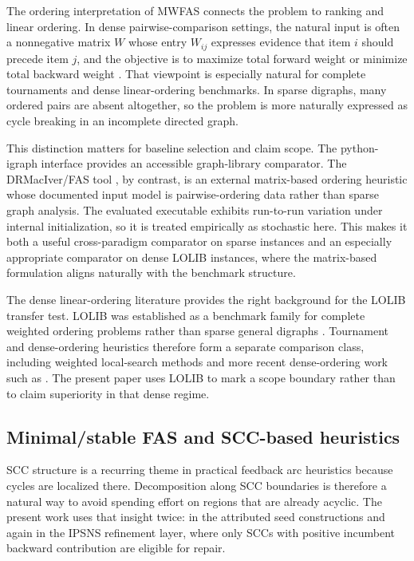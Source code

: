 The ordering interpretation of MWFAS connects the problem to ranking and linear ordering. In dense pairwise-comparison settings, the natural input is often a nonnegative matrix \(W\) whose entry \(W_{ij}\) expresses evidence that item \(i\) should precede item \(j\), and the objective is to maximize total forward weight or minimize total backward weight \cite{ACN08,CFR10}. That viewpoint is especially natural for complete tournaments and dense linear-ordering benchmarks. In sparse digraphs, many ordered pairs are absent altogether, so the problem is more naturally expressed as cycle breaking in an incomplete directed graph.

This distinction matters for baseline selection and claim scope. The python-igraph interface \cite{python_igraph_feedback_arc_set} provides an accessible graph-library comparator. The DRMacIver/FAS tool \cite{drmaciver_feedback_arc_set}, by contrast, is an external matrix-based ordering heuristic whose documented input model is pairwise-ordering data rather than sparse graph analysis. The evaluated executable exhibits run-to-run variation under internal initialization, so it is treated empirically as stochastic here. This makes it both a useful cross-paradigm comparator on sparse instances and an especially appropriate comparator on dense LOLIB instances, where the matrix-based formulation aligns naturally with the benchmark structure.

The dense linear-ordering literature provides the right background for the LOLIB transfer test. LOLIB was established as a benchmark family for complete weighted ordering problems rather than sparse general digraphs \cite{MRD12,lolib_library}. Tournament and dense-ordering heuristics therefore form a separate comparison class, including weighted local-search methods \cite{FLRS10} and more recent dense-ordering work such as \cite{OZ24}. The present paper uses LOLIB to mark a scope boundary rather than to claim superiority in that dense regime.

\subsection{Minimal/stable FAS and SCC-based heuristics}

SCC structure is a recurring theme in practical feedback arc heuristics because cycles are localized there. Decomposition along SCC boundaries is therefore a natural way to avoid spending effort on regions that are already acyclic. The present work uses that insight twice: in the attributed seed constructions and again in the IPSNS refinement layer, where only SCCs with positive incumbent backward contribution are eligible for repair.

